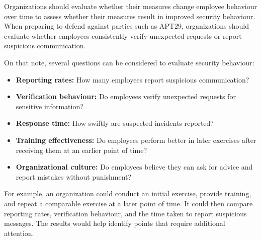 Organizations should evaluate whether their measures change employee behaviour over time to assess whether their measures result in improved security behaviour. When preparing to defend against parties such as APT29, organizations should evaluate whether employees consistently verify unexpected requests or report suspicious communication.  

On that note, several questions can be considered to evaluate security behaviour: 

\begin{itemize}
    \item \textbf{Reporting rates:} How many employees report suspicious communication? 
    \item \textbf{Verification behaviour:} Do employees verify unexpected requests for sensitive information? 
    \item \textbf{Response time:} How swiftly are suspected incidents reported? 
    \item \textbf{Training effectiveness:} Do employees perform better in later exercises after receiving them at an earlier point of time?
    \item \textbf{Organizational culture:} Do employees believe they can ask for advice and report mistakes without punishment?
\end{itemize}

For example, an organization could conduct an initial exercise, provide training, and repeat a comparable exercise at a later point of time. It could then compare reporting rates, verification behaviour, and the time taken to report suspicious messages. The results would help identify points that require additional attention.~\parencite{europeanSecurity.2018}
